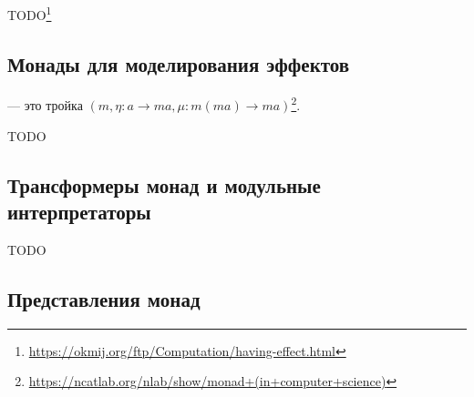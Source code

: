 
TODO\footnote{\url{https://okmij.org/ftp/Computation/having-effect.html}} %


\subsection{Монады для моделирования эффектов}

 --- это тройка $(m, \eta : a \to m a, \mu : m (m a) \to m a)$\footnote{\url{https://ncatlab.org/nlab/show/monad+(in+computer+science)}}.

TODO\cite{moggi1988computational, wadler1990comprehending}




\subsection{Трансформеры монад и модульные интерпретаторы}




TODO\cite{liang1995monad} %

\subsection{Представления монад}










